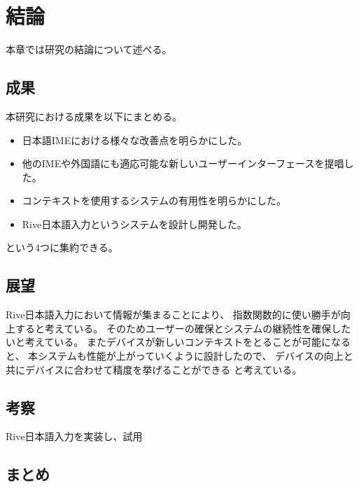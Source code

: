 \chapter{結論}
\label{chap:conclusion}
本章では研究の結論について述べる。

\newpage
\section{成果}
本研究における成果を以下にまとめる。
\begin{itemize}
  \item 日本語IMEにおける様々な改善点を明らかにした。
  \item 他のIMEや外国語にも適応可能な新しいユーザーインターフェースを提唱した。
  \item コンテキストを使用するシステムの有用性を明らかにした。
  \item Rive日本語入力というシステムを設計し開発した。
\end{itemize}
という4つに集約できる。

\section{展望}
Rive日本語入力において情報が集まることにより、
指数関数的に使い勝手が向上すると考えている。
そのためユーザーの確保とシステムの継続性を確保したいと考えている。
またデバイスが新しいコンテキストをとることが可能になると、
本システムも性能が上がっていくように設計したので、
デバイスの向上と共にデバイスに合わせて精度を挙げることができる
と考えている。

\section{考察}
Rive日本語入力を実装し、試用

\section{まとめ}

